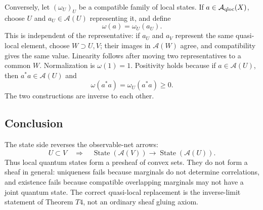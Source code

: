 Conversely, let \((\omega_U)_U\) be a compatible family of local states.  If
\(a\in\mathcal A_{\rm qloc}(X)\), choose \(U\) and \(a_U\in\mathcal A(U)\)
representing it, and define
\[
  \omega(a)=\omega_U(a_U).
\]
This is independent of the representative: if \(a_U\) and \(a_V\) represent
the same quasi-local element, choose \(W\supset U,V\); their images in
\(\mathcal A(W)\) agree, and compatibility gives the same value.  Linearity
follows after moving two representatives to a common \(W\).  Normalization is
\(\omega(1)=1\).  Positivity holds because if
\(a\in\mathcal A(U)\), then \(a^*a\in\mathcal A(U)\) and
\[
  \omega(a^*a)=\omega_U(a^*a)\geq0.
\]
The two constructions are inverse to each other.

\subsection{Conclusion}

The state side reverses the observable-net arrows:
\[
  U\subset V\quad\Rightarrow\quad
  \operatorname{State}(\mathcal A(V))
  \longrightarrow
  \operatorname{State}(\mathcal A(U)).
\]
Thus local quantum states form a presheaf of convex sets.  They do not form a
sheaf in general: uniqueness fails because marginals do not determine
correlations, and existence fails because compatible overlapping marginals may
not have a joint quantum state.  The correct quasi-local replacement is the
inverse-limit statement of Theorem \(T4\), not an ordinary sheaf gluing axiom.
